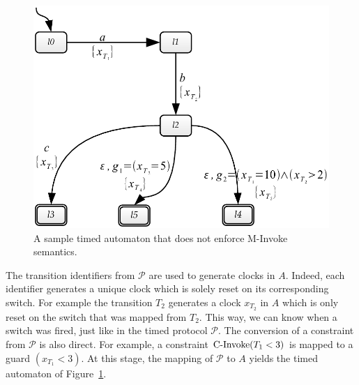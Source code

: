 \begin{figure}[htbp]
    \centering
    \includegraphics[width=\textwidth]{content/protocol-model/bogus-pta-constraint}
    \caption{A sample timed automaton that does not enforce M-Invoke semantics.}
    \label{fig:bogus-pta-constraint}
\end{figure}

The transition identifiers from $\mathcal{P}$ are used to generate clocks in $A$. Indeed, each identifier generates a unique clock which is solely reset on its corresponding switch. For example the transition $T_2$ generates a clock $x_{T_2}$ in $A$ which is only reset on the switch that was mapped from $T_2$. This way, we can know when a switch was fired, just like in the timed protocol $\mathcal{P}$. The conversion of a \CInvoke constraint from $\mathcal{P}$ is also direct. For example, a constraint $\mbox{C-Invoke}(T_1 < 3)$ is mapped to a guard $(x_{T_1} < 3)$. At this stage, the mapping of $\mathcal{P}$ to $A$ yields the timed automaton of Figure~\ref{fig:bogus-pta-constraint}.\\

